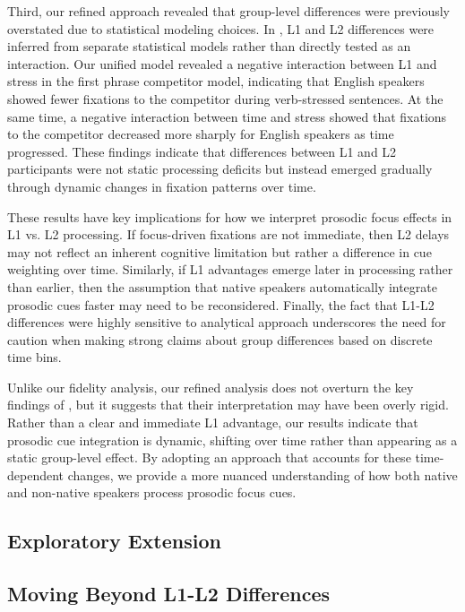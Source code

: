 Third, our refined approach revealed that group-level differences were previously overstated due to statistical modeling choices. In \citep{Ge2021}, L1 and L2 differences were inferred from separate statistical models rather than directly tested as an interaction. Our unified model revealed a negative interaction between L1 and stress in the first phrase competitor model, indicating that English speakers showed fewer fixations to the competitor during verb-stressed sentences. At the same time, a negative interaction between time and stress showed that fixations to the competitor decreased more sharply for English speakers as time progressed. These findings indicate that differences between L1 and L2 participants were not static processing deficits but instead emerged gradually through dynamic changes in fixation patterns over time.

These results have key implications for how we interpret prosodic focus effects in L1 vs. L2 processing. If focus-driven fixations are not immediate, then L2 delays may not reflect an inherent cognitive limitation but rather a difference in cue weighting over time. Similarly, if L1 advantages emerge later in processing rather than earlier, then the assumption that native speakers automatically integrate prosodic cues faster may need to be reconsidered. Finally, the fact that L1-L2 differences were highly sensitive to analytical approach underscores the need for caution when making strong claims about group differences based on discrete time bins.

Unlike our fidelity analysis, our refined analysis does not overturn the key findings of \citep{Ge2021}, but it suggests that their interpretation may have been overly rigid. Rather than a clear and immediate L1 advantage, our results indicate that prosodic cue integration is dynamic, shifting over time rather than appearing as a static group-level effect. By adopting an approach that accounts for these time-dependent changes, we provide a more nuanced understanding of how both native and non-native speakers process prosodic focus cues.

\subsection{Exploratory Extension}




\subsection{Moving Beyond L1-L2 Differences}


